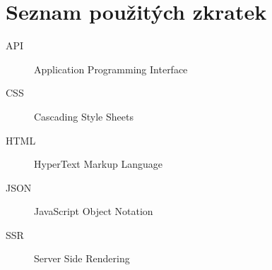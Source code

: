 \chapter{Seznam použitých zkratek}
\begin{description}
	\item[API] Application Programming Interface
	\item[CSS] Cascading Style Sheets   
	\item[HTML] HyperText Markup Language
	\item[JSON] JavaScript Object Notation
	\item[SSR] Server Side Rendering
\end{description}